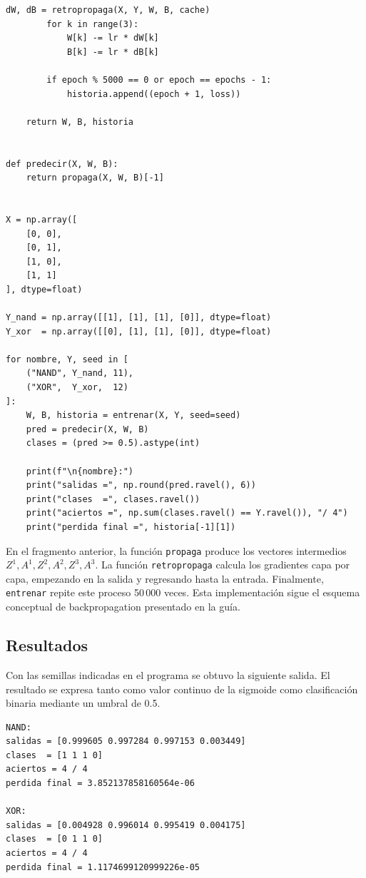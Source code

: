 \documentclass[14pt,twoside]{article}
\begin{document}
\begin{lstlisting}[style=pgpython,caption={Implementación desde cero de una red con dos capas ocultas.}]
        dW, dB = retropropaga(X, Y, W, B, cache)
        for k in range(3):
            W[k] -= lr * dW[k]
            B[k] -= lr * dB[k]

        if epoch % 5000 == 0 or epoch == epochs - 1:
            historia.append((epoch + 1, loss))

    return W, B, historia


def predecir(X, W, B):
    return propaga(X, W, B)[-1]


X = np.array([
    [0, 0],
    [0, 1],
    [1, 0],
    [1, 1]
], dtype=float)

Y_nand = np.array([[1], [1], [1], [0]], dtype=float)
Y_xor  = np.array([[0], [1], [1], [0]], dtype=float)

for nombre, Y, seed in [
    ("NAND", Y_nand, 11),
    ("XOR",  Y_xor,  12)
]:
    W, B, historia = entrenar(X, Y, seed=seed)
    pred = predecir(X, W, B)
    clases = (pred >= 0.5).astype(int)

    print(f"\n{nombre}:")
    print("salidas =", np.round(pred.ravel(), 6))
    print("clases  =", clases.ravel())
    print("aciertos =", np.sum(clases.ravel() == Y.ravel()), "/ 4")
    print("perdida final =", historia[-1][1])
\end{lstlisting}

En el fragmento anterior, la función \texttt{propaga} produce los vectores intermedios $Z^1,A^1,Z^2,A^2,Z^3,A^3$. La función \texttt{retropropaga} calcula los gradientes capa por capa, empezando en la salida y regresando hasta la entrada. Finalmente, \texttt{entrenar} repite este proceso 50\,000 veces. Esta implementación sigue el esquema conceptual de backpropagation presentado en la guía. \cite{martinez2026}

\subsection{Resultados}

Con las semillas indicadas en el programa se obtuvo la siguiente salida. El resultado se expresa tanto como valor continuo de la sigmoide como clasificación binaria mediante un umbral de 0.5.

\begin{lstlisting}[style=pgterminal,caption={Resultados obtenidos para NAND y XOR.}]
NAND:
salidas = [0.999605 0.997284 0.997153 0.003449]
clases  = [1 1 1 0]
aciertos = 4 / 4
perdida final = 3.852137858160564e-06

XOR:
salidas = [0.004928 0.996014 0.995419 0.004175]
clases  = [0 1 1 0]
aciertos = 4 / 4
perdida final = 1.1174699120999226e-05
\end{lstlisting}
\end{document}
